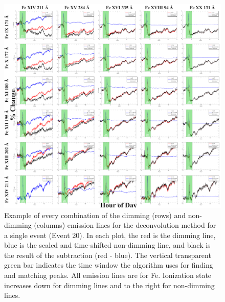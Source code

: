 \begin{figure}[!h]
    \begin{center}
	    \includegraphics[width=\textwidth]{Images/AllDeconvolutionsEvent20.png}
    \end{center}
    \caption[All deconvolution combinations example]{
        Example of every combination of the dimming (rows) and non-dimming (columns) emission lines for the deconvolution 
        method for a single event (Event 20). In each plot, the red is the dimming line, blue is the scaled and time-shifted 
        non-dimming line, and black is the result of the subtraction (red - blue). The vertical transparent green bar 
        indicates the time window the algorithm uses for finding and matching peaks. All emission lines are for Fe. 
        Ionization state increases down for dimming lines and to the right for non-dimming lines. 
   	}
    \label{fig:deconvolutioncombinations}
\end{figure}

